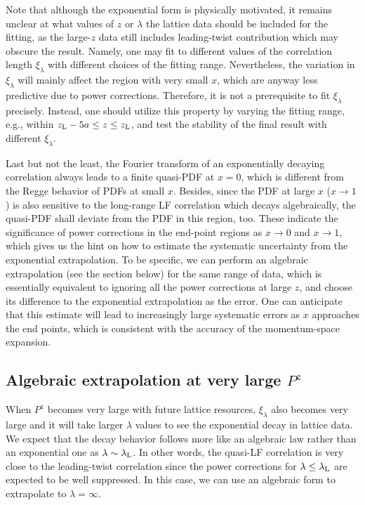 Note that although the exponential form is physically motivated, it remains unclear at what values of $z$ or $\lambda$ the lattice data should be included for the fitting, as the large-$z$ data still includes leading-twist contribution which may obscure the result. Namely, one may fit to different values of the correlation length $\xi_\lambda$ with different choices of the fitting range. Nevertheless, the variation in $\xi_\lambda$ will mainly affect the region with very small $x$, which are anyway less predictive due to power corrections. Therefore, it is not a prerequisite to fit $\xi_\lambda$ precisely. Instead, one should utilize this property by varying the fitting range, e.g., within $z_{\rm L}-5a\le z \le z_{\rm L}$, and test the stability of the final result with different $\xi_{\lambda}$.

Last but not the least, the Fourier transform of an exponentially decaying correlation always leads to a finite quasi-PDF at $x=0$, which is different from the Regge behavior of PDFs at small $x$. Besides, since the PDF at large $x$ ($x\to1$) is also sensitive to the long-range LF correlation which decays algebraically, the quasi-PDF shall deviate from the PDF in this region, too. These indicate the significance of power corrections in the end-point regions as $x\to0$ and $x\to1$, which gives us the hint on how to estimate the systematic uncertainty from the exponential extrapolation. To be specific, we can perform an algebraic extrapolation (see the section below) for the same range of data, which is essentially equivalent to ignoring all the power corrections at large $z$, and choose its difference to the exponential extrapolation as the error. One can anticipate that this estimate will lead to increasingly large systematic errors as $x$ approaches the end points, which is consistent with the accuracy of the momentum-space expansion.

\subsection{Algebraic extrapolation at very large $P^z$}

When $P^z$ becomes very large with future lattice resources,
 $\xi_\lambda$ also becomes very large and it will take larger $\lambda$ values to see the exponential decay in lattice data. We expect that the decay behavior follows more like an algebraic law rather than an exponential one as $\lambda\sim\lambda_{\rm L}$. In other words, the quasi-LF correlation is very close to the leading-twist correlation since the power corrections for $\lambda \le \lambda_{\rm L}$ are expected to be well suppressed. In this case, we can use an algebraic form to extrapolate to $\lambda=\infty$.


